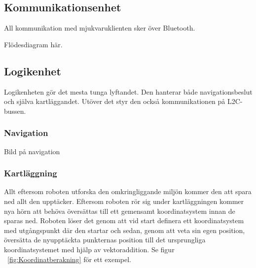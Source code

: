 \documentclass{article}
\begin{document}
\subsection{Kommunikationsenhet}
All kommunikation med mjukvaruklienten sker över Bluetooth.

Flödesdiagram här.

\subsection{Logikenhet}
Logikenheten gör det mesta tunga lyftandet. Den hanterar både navigationsbeslut och själva kartläggandet. Utöver det styr den också kommunikationen på L2C-bussen.

\subsubsection{Navigation}
Bild på navigation

\subsubsection{Kartläggning}

Allt eftersom roboten utforska den omkringliggande miljön kommer den att spara ned allt den upptäcker. Eftersom roboten rör sig under kartläggningen kommer nya hörn att behöva översättas till ett gemensamt koordinatsystem innan de sparas ned. Roboten löser det genom att vid start definera ett koordinatsystem med utgångspunkt där den startar och sedan, genom att veta sin egen position, översätta de nyupptäckta punkternas position till det ursprungliga koordinatsystemet med hjälp av vektoraddition. Se figur ~\ref{fig:Koordinatberakning} för ett exempel.
\end{document}
